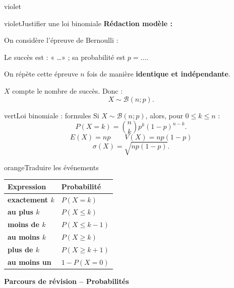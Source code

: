 \documentclass[11pt,a4paper]{article}
\newcommand{\Bin}{\mathcal B}
\begin{document}
\begin{landscape}
\begin{minipage}[t]{0.242\linewidth}
\begin{panel}{violet}
\begin{fichebox}{violet}{Justifier une loi binomiale}
\textbf{Rédaction modèle :}

\smallskip
On considère l'épreuve de Bernoulli : \dotfill

\smallskip
Le succès est : « \ldots » ; sa probabilité est $p=\ldots$.

\smallskip
On répète cette épreuve $n$ fois de manière \textbf{identique et indépendante}.

\smallskip
$X$ compte le nombre de succès. Donc :
\[
X\sim\Bin(n;p).
\]
\end{fichebox}

\begin{fichebox}{vert}{Loi binomiale : formules}
Si $X\sim\Bin(n;p)$, alors, pour $0\leq k\leq n$ :
\[
P(X=k)=\binom nk p^k(1-p)^{n-k}.
\]
\[
E(X)=np\qquad V(X)=np(1-p)
\]
\[
\sigma(X)=\sqrt{np(1-p)}.
\]
\end{fichebox}

\begin{fichebox}{orange}{Traduire les événements}
\footnotesize
\begin{tabularx}{\linewidth}{>{\bfseries}X >{\centering\arraybackslash}X}
Expression & Probabilité \\
\hline
exactement $k$ & $P(X=k)$ \\
au plus $k$ & $P(X\leq k)$ \\
moins de $k$ & $P(X\leq k-1)$ \\
au moins $k$ & $P(X\geq k)$ \\
plus de $k$ & $P(X\geq k+1)$ \\
au moins un & $1-P(X=0)$
\end{tabularx}
\end{fichebox}

\end{panel}
\end{minipage}




\newpage
\thispagestyle{empty}

\begin{tcolorbox}[
    colback=white,
    colframe=bleu!70!black,
    boxrule=0.65pt,
    arc=3mm,
    left=2.5mm,right=2.5mm,top=1.15mm,bottom=1.15mm,
    before skip=0mm,
    after skip=1.4mm,
    drop fuzzy shadow=black!10
]
{\Large\bfseries Parcours de révision -- Probabilités}\hfill


\vspace{0.25mm}

\end{tcolorbox}


\end{landscape}
\end{document}
